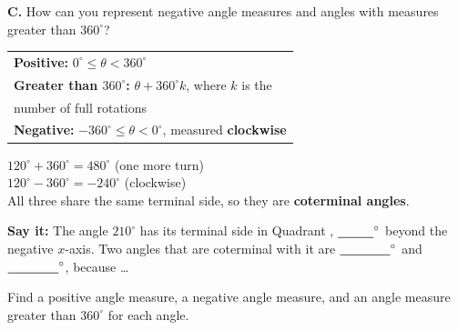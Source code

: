 \newpage
\textbf{C.} How can you represent negative angle measures and angles with measures greater than $360^\circ$?

\begin{minipage}[t]{0.52\textwidth}
\small
\begin{tabular}[t]{@{}l@{}}
\textbf{Positive:} $0^\circ\le\theta<360^\circ$\\
\textbf{Greater than $360^\circ$:} $\theta+360^\circ k$, where $k$ is the\\ \quad number of full rotations\\
\textbf{Negative:} $-360^\circ\le\theta<0^\circ$, measured \textbf{clockwise}
\end{tabular}
\normalsize
\end{minipage}\hfill
\begin{minipage}[t]{0.44\textwidth}
$120^\circ+360^\circ=480^\circ$ (one more turn)\\
$120^\circ-360^\circ=-240^\circ$ (clockwise)\\[2pt]
All three share the same terminal side, so they are \textbf{coterminal angles}.
\end{minipage}

\vspace{2pt}
\noindent
\begin{minipage}[t]{0.32\textwidth}\centering
{}
\end{minipage}\hfill
\begin{minipage}[t]{0.32\textwidth}\centering
{}
\end{minipage}\hfill
\begin{minipage}[t]{0.32\textwidth}\centering
{}
\end{minipage}

\vspace{4pt}
\textbf{Say it:} The angle $210^\circ$ has its terminal side in Quadrant \blank[1cm], $\blank[1cm]^\circ$ beyond the negative $x$-axis. Two angles that are coterminal with it are $\blank[1.4cm]^\circ$ and $\blank[1.4cm]^\circ$, because \dots\lines[2]

Find a positive angle measure, a negative angle measure, and an angle measure greater than $360^\circ$ for each angle.

